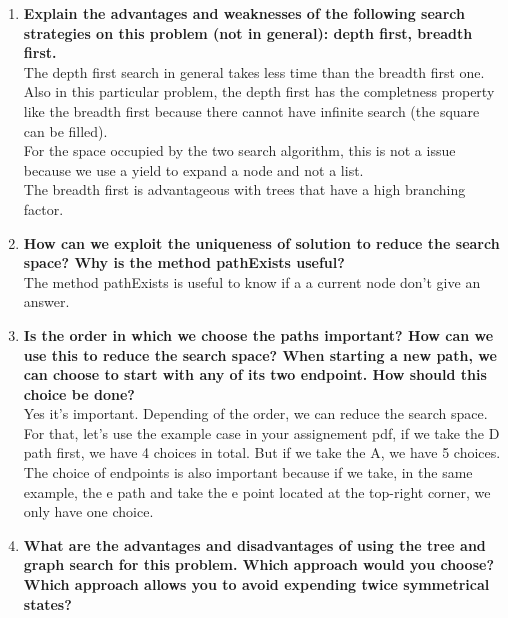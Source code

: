 \documentclass[10pt,a4paper]{article}
\begin{document}
\begin{enumerate}
	
	\item \textbf{ Explain the advantages and weaknesses of the following search strategies on this problem (not in general): depth first, breadth first.} \\
	
	The depth first search in general takes less time than the breadth first one. Also in this particular problem, the depth first has the completness property like the breadth first because there cannot have infinite search (the square can be filled). \\
	
	For the space occupied by the two search algorithm, this is not a issue because we use a yield to expand a node and not a list. \\
	
	The breadth first is advantageous with trees that have a high branching factor.
	
	\item \textbf{How can we exploit the uniqueness of solution to reduce the search space? Why is the method pathExists useful?} \\
	
	The method pathExists is useful to know if a a current node don't give an answer. \\
	
	
	\item \textbf{Is the order in which we choose the paths important? How can we use this to reduce the search space? When starting a new path, we can choose to start with any of its two endpoint. How should this choice be done?} \\
	
	Yes it's important. Depending of the order, we can reduce the search space. For that, let's use the example case in your assignement pdf, if we take the D path first, we have 4 choices in total. But if we take the A, we have 5 choices. \\
	
	The choice of endpoints is also important because if we take, in the same example, the e path and take the e point located at the top-right corner, we only have one choice. \\
	
	\item \textbf{What are the advantages and disadvantages of using the tree and graph search for this problem. Which approach would you choose? Which approach allows you to avoid expending twice symmetrical states?} \\
	

\end{enumerate}
\end{document}
